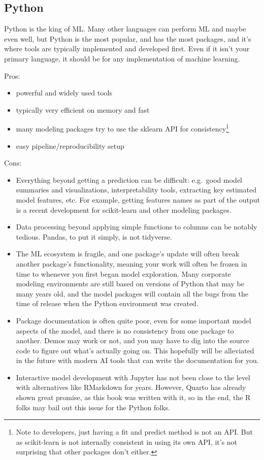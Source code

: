\documentclass[
  letterpaper,
]{krantz}
\providecommand{\tightlist}{%
  \setlength{\itemsep}{0pt}\setlength{\parskip}{0pt}}\usepackage{longtable,booktabs,array}
\begin{document}
\subsection{Python}\label{python-80}

Python is the king of ML. Many other languages can perform ML and maybe
even well, but Python is the most popular, and has the most packages,
and it's where tools are typically implemented and developed first. Even
if it isn't your primary language, it should be for any implementation
of machine learning.

Pros:

\begin{itemize}
\tightlist
\item
  powerful and widely used tools
\item
  typically very efficient on memory and fast
\item
  many modeling packages try to use the sklearn API for
  consistency\footnote{Note to developers, just having a fit and predict
    method is not an API. But as scikit-learn is not internally
    consistent in using its own API, it's not surprising that other
    packages don't either.}
\item
  easy pipeline/reproducibility setup
\end{itemize}

Cons:

\begin{itemize}
\tightlist
\item
  Everything beyond getting a prediction can be difficult: e.g.~good
  model summaries and visualizations, interpretability tools, extracting
  key estimated model features, etc. For example, getting features names
  as part of the output is a recent development for scikit-learn and
  other modeling packages.
\item
  Data processing beyond applying simple functions to columns can be
  notably tedious. Pandas, to put it simply, is not tidyverse.
\item
  The ML ecosystem is fragile, and one package's update will often break
  another package's functionality, meaning your work will often be
  frozen in time to whenever you first began model exploration. Many
  corporate modeling environments are still based on versions of Python
  that may be many years old, and the model packages will contain all
  the bugs from the time of release when the Python environment was
  created.
\item
  Package documentation is often quite poor, even for some important
  model aspects of the model, and there is no consistency from one
  package to another. Demos may work or not, and you may have to dig
  into the source code to figure out what's actually going on. This
  hopefully will be alleviated in the future with modern AI tools that
  can write the documentation for you.
\item
  Interactive model development with Jupyter has not been close to the
  level with alternatives like RMarkdown for years. However, Quarto has
  already shown great promise, as this book was written with it, so in
  the end, the R folks may bail out this issue for the Python folks.
\end{itemize}
\end{document}
